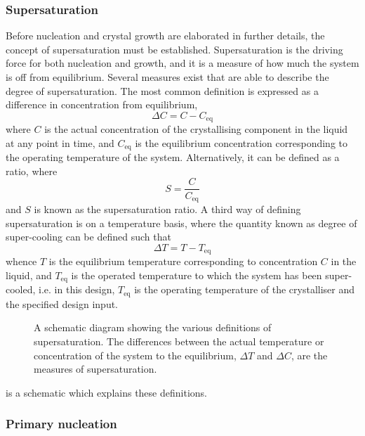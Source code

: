 \subsubsection{Supersaturation}

Before nucleation and crystal growth are elaborated in further details, the concept of supersaturation must be established. Supersaturation is the driving force for both nucleation and growth, and it is a measure of how much the system is off from equilibrium. Several measures exist that are able to describe the degree of supersaturation. The most common definition is expressed as a difference in concentration from equilibrium,
\begin{equation}\label{eq:deltaC}
    \Delta C = C - C_{\mathrm{eq}}
\end{equation}
where $C$ is the actual concentration of the crystallising component in the liquid at any point in time, and $C_{\mathrm{eq}}$ is the equilibrium concentration corresponding to the operating temperature of the system. Alternatively, it can be defined as a ratio, where
\begin{equation} \label{eq: supersaturation ratio}
    S = \frac{C}{C_{\mathrm{eq}}}
\end{equation}
and $S$ is known as the supersaturation ratio. A third way of defining supersaturation is on a temperature basis, where the quantity known as degree of super-cooling can be defined such that
\begin{equation} \label{eq:deltaT}
     \Delta T = T - T_{\mathrm{eq}}
\end{equation}
whence $T$ is the equilibrium temperature corresponding to concentration $C$ in the liquid, and $T_{\mathrm{eq}}$ is the operated temperature to which the system has been super-cooled, i.e. in this design, $T_{\mathrm{eq}}$ is the operating temperature of the crystalliser and the specified design input.
\begin{figure}
    
    \caption{A schematic diagram showing the various definitions of supersaturation. The differences between the actual temperature or concentration of the system to the equilibrium, $\Delta T$ and $\Delta C$, are the measures of supersaturation.}
    \label{fig:supersaturation}
\end{figure}
 is a schematic which explains these definitions.

\subsubsection{Primary nucleation}\label{sec:primary nucleation}

